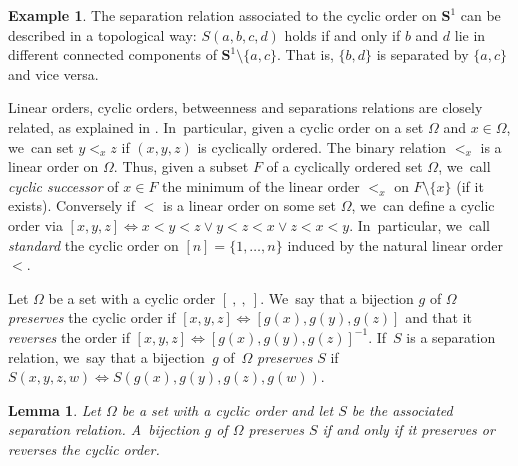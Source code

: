 \documentclass[JEP,XML,SOM,Unicode,NoFloatCountersInSection,published]{cedram}
\theoremstyle{plain}
\newtheorem{lemma}[theorem]{Lemma}
\theoremstyle{definition}
\newtheorem{example}[theorem]{Example}
\theoremstyle{remark}
\begin{document}
\begin{example}
The separation relation associated to the cyclic order on $\mathbf{S}^1$ can be described in a topological way:
$S(a,b,c,d)$ holds if and only if $b$ and $d$ lie in different connected components of $\mathbf{S}^1\setminus\{a,c\}$.
That is, $\{b,d\}$ is separated by $\{a,c\}$ and vice versa.
\end{example}

Linear orders, cyclic orders, betweenness and separations relations are closely related, as explained in \cite{Huntington}. In~particular, given a cyclic order on a set $\Omega$ and $x\in\Omega$, we~can set $y<_xz$ if $(x,y,z)$ is cyclically ordered.
The binary relation $<_x$ is a linear order on $\Omega$.
Thus, given a subset $F$ of a cyclically ordered set $\Omega$, we~call \emph{cyclic successor} of $x\in F$ the minimum of the linear order $<_x$ on $F\setminus\{x\}$ (if it exists).
Conversely if $<$ is a linear order on some set $\Omega$, we~can define a cyclic order via $[x,y,z]\iff x<y<z\vee y<z<x \vee z<x<y$. In~particular, we~call \emph{standard} the cyclic order on $[n]=\{1,\dots,n\}$ induced by the natural linear order $<$.

Let $\Omega$ be a set with a cyclic order $[\ ,\ ,\ ]$. We~say that a bijection $g$ of $\Omega$ \emph{preserves} the cyclic order if $[x,y,z]\iff [g(x),g(y),g(z)]$ and that it \emph{reverses} the order if $[x,y,z]\iff [g(x),g(y),g(z)]^{-1}$. If~$S$ is a separation relation, we~say that a bijection~$g$ of~$\Omega$ \emph{preserves} $S$ if $S(x,y,z,w)\iff S(g(x),g(y),g(z),g(w))$.

\begin{lemma}
\label{lem.preserves.respects.cyclic.order}
Let $\Omega$ be a set with a cyclic order and let $S$ be the associated separation relation. A~bijection $g$ of $\Omega$ preserves $S$ if and only if it preserves or reverses the cyclic order.
\end{lemma}
\end{document}
